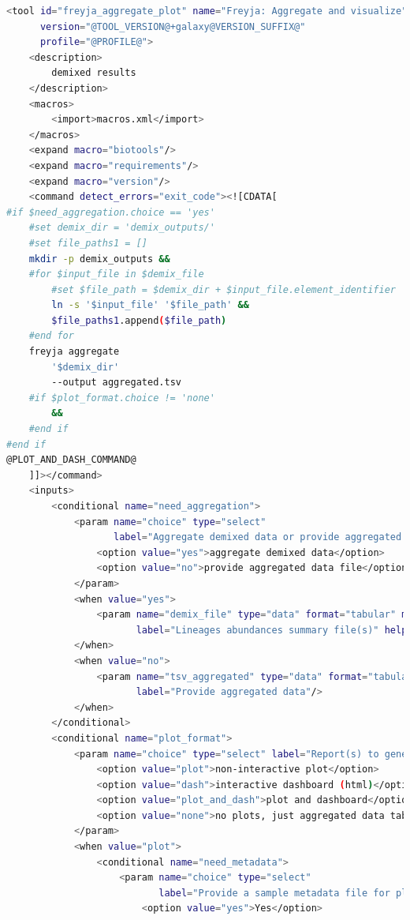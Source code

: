 \begin{lstlisting}[language=bash, caption=tool wrapper for Freyja: Aggregate and visualize demixed results, label=list:methods:wrapper-freyja-agg]
<tool id="freyja_aggregate_plot" name="Freyja: Aggregate and visualize"
      version="@TOOL_VERSION@+galaxy@VERSION_SUFFIX@"
      profile="@PROFILE@">
    <description>
        demixed results
    </description>
    <macros>
        <import>macros.xml</import>
    </macros>
    <expand macro="biotools"/>
    <expand macro="requirements"/>
    <expand macro="version"/>
    <command detect_errors="exit_code"><![CDATA[
#if $need_aggregation.choice == 'yes'
    #set demix_dir = 'demix_outputs/'
    #set file_paths1 = []
    mkdir -p demix_outputs &&
    #for $input_file in $demix_file
        #set $file_path = $demix_dir + $input_file.element_identifier
        ln -s '$input_file' '$file_path' &&
        $file_paths1.append($file_path)
    #end for
    freyja aggregate
        '$demix_dir'
        --output aggregated.tsv
    #if $plot_format.choice != 'none'
        &&
    #end if
#end if
@PLOT_AND_DASH_COMMAND@
    ]]></command>
    <inputs>
        <conditional name="need_aggregation">
            <param name="choice" type="select"
                   label="Aggregate demixed data or provide aggregated data file?">
                <option value="yes">aggregate demixed data</option>
                <option value="no">provide aggregated data file</option>
            </param>
            <when value="yes">
                <param name="demix_file" type="data" format="tabular" multiple="true"
                       label="Lineages abundances summary file(s)" help="One file per one sample."/>
            </when>
            <when value="no">
                <param name="tsv_aggregated" type="data" format="tabular"
                       label="Provide aggregated data"/>
            </when>
        </conditional>
        <conditional name="plot_format">
            <param name="choice" type="select" label="Report(s) to generate">
                <option value="plot">non-interactive plot</option>
                <option value="dash">interactive dashboard (html)</option>
                <option value="plot_and_dash">plot and dashboard</option>
                <option value="none">no plots, just aggregated data table</option>
            </param>
            <when value="plot">
                <conditional name="need_metadata">
                    <param name="choice" type="select"
                           label="Provide a sample metadata file for plotting data over time?">
                        <option value="yes">Yes</option>

\end{lstlisting}
